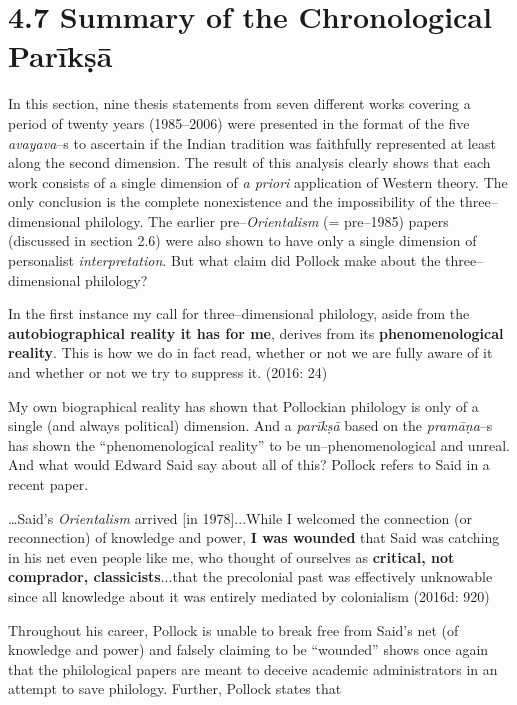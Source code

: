 \section*{4.7 Summary of the Chronological Parīkṣā}

In this section, nine thesis statements from seven different works covering a period of twenty years (1985–2006) were presented in the format of the five \textit{avayava}–s to ascertain if the Indian tradition was faithfully represented at least along the second dimension. The result of this analysis clearly shows that each work consists of a single dimension of \textit{a priori} application of Western theory. The only conclusion is the complete nonexistence and the impossibility of the three–dimensional philology. The earlier pre–\textit{Orientalism} (= pre–1985) papers (discussed in section 2.6) were also shown to have only a single dimension of personalist \textit{interpretation}. But what claim did Pollock make about the three–dimensional philology?

\begin{myquote}
In the first instance my call for three–dimensional philology, aside from the \textbf{autobiographical reality it has for me}, derives from its \textbf{phenomenological reality}. This is how we do in fact read, whether or not we are fully aware of it and whether or not we try to suppress it. (2016: 24)
\end{myquote}

My own biographical reality has shown that Pollockian philology is only of a single (and always political) dimension. And a \textit{parīkṣā} based on the \textit{pramāṇa}–s has shown the “phenomenological reality” to be un–phenomenological and unreal. And what would Edward Said say about all of this? Pollock refers to Said in a recent paper.

\begin{myquote}
…Said’s \textit{Orientalism} arrived [in 1978]...While I welcomed the connection (or reconnection) of knowledge and power, \textbf{I was wounded} that Said was catching in his net even people like me, who thought of ourselves as \textbf{critical, not comprador, classicists}...that the precolonial past was effectively unknowable since all knowledge about it was entirely mediated by colonialism (2016d: 920)
\end{myquote}

Throughout his career, Pollock is unable to break free from Said’s net (of knowledge and power) and falsely claiming to be “wounded” shows once again that the philological papers are meant to deceive academic administrators in an attempt to save philology. Further, Pollock states that

